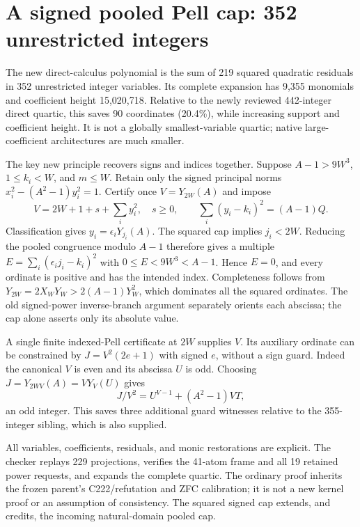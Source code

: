 \section{A signed pooled Pell cap: 352 unrestricted integers}
The new direct-calculus polynomial is the sum of 219 squared quadratic
residuals in 352 unrestricted integer variables. Its complete expansion has
9,355 monomials and coefficient height 15,020,718. Relative to the newly
reviewed 442-integer direct quartic, this saves 90 coordinates (20.4\%),
while increasing support and coefficient height. It is not a globally
smallest-variable quartic; native large-coefficient architectures are much
smaller.

The key new principle recovers signs and indices together. Suppose
$A-1>9W^3$, $1\leq k_i<W$, and $m\leq W$. Retain only the signed principal
norms $x_i^2-(A^2-1)y_i^2=1$. Certify once $V=Y_{2W}(A)$ and impose
\[
 V=2W+1+s+\sum_i y_i^2,\quad s\geq0,
 \qquad \sum_i(y_i-k_i)^2=(A-1)Q.
\]
Classification gives $y_i=\epsilon_iY_{j_i}(A)$. The squared cap implies
$j_i<2W$. Reducing the pooled congruence modulo $A-1$ therefore gives a
multiple $E=\sum_i(\epsilon_i j_i-k_i)^2$ with
$0\leq E<9W^3<A-1$. Hence $E=0$, and every ordinate is positive and has
the intended index. Completeness follows from
$Y_{2W}=2X_WY_W>2(A-1)Y_W^2$, which dominates all the squared ordinates.
The old signed-power inverse-branch argument separately orients each
abscissa; the cap alone asserts only its absolute value.

A single finite indexed-Pell certificate at $2W$ supplies $V$. Its auxiliary
ordinate can be constrained by $J=V^2(2e+1)$ with signed $e$, without a sign
guard. Indeed the canonical $V$ is even and its abscissa $U$ is odd. Choosing
$J=Y_{2WV}(A)=VY_V(U)$ gives
\[
 J/V^2=U^{V-1}+(A^2-1)VT,
\]
an odd integer. This saves three additional guard witnesses relative to the
355-integer sibling, which is also supplied.

All variables, coefficients, residuals, and monic restorations are explicit.
The checker replays 229 projections, verifies the 41-atom frame and all
19 retained power requests, and expands the complete quartic. The ordinary
proof inherits the frozen parent's C222/refutation and ZFC calibration;
it is not a new kernel proof or an assumption of consistency. The squared
signed cap extends, and credits, the incoming natural-domain pooled cap.
